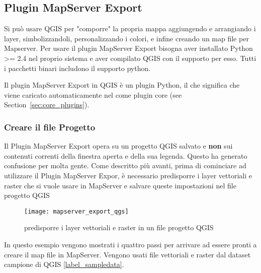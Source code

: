 
\subsection{Plugin MapServer Export}\label{sec:mapserver_export}


Si può usare QGIS per "comporre" la propria mappa aggiungendo e arrangiando i layer, simbolizzandoli, personalizzando i colori, e infine creando un map file per Mapserver. Per usare il plugin MapServer Export bisogna aver installato Python >= 2.4 nel proprio sistema e aver compilato QGIS con il supporto per esso. Tutti i pacchetti binari includono il supporto python.

Il plugin MapServer Export in QGIS \CURRENT è un plugin Python, il che significa che viene caricato automaticamente nel   come plugin core 
(see Section~\ref{sec:core_plugins}).

\subsubsection{Creare il file Progetto}

Il Plugin MapServer Export opera su un progetto QGIS salvato e 
\textbf{non} sui contenuti correnti della finestra aperta e della sua legenda. Questo ha generato confusione per molta gente.  Come descritto più avanti, prima di cominciare ad utilizzare il Plugin MapServer Expor, è necessario predisporre i layer vettoriali e raster che si vuole usare in MapServer e salvare queste impostazioni nel file progetto QGIS

\begin{figure}[ht]
\begin{center}
  \caption{predisporre i layer vettoriali e raster in un file progetto QGIS \nixcaption}
  \label{fig:mapserver_export_qgs}\smallskip
  \texttt{[image: mapserver\_export\_qgs]}
\end{center}
\end{figure}

In questo esempio vengono mostrati i quattro passi per arrivare ad essere pronti a creare il map file in MapServer. Vengono usati file vettoriali e raster dal dataset campione di QGIS \ref{label_sampledata}.

